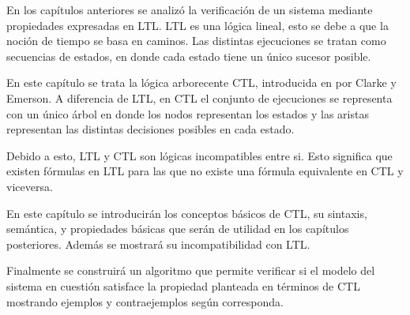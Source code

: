 En los capítulos anteriores se analizó la verificación de un sistema mediante propiedades expresadas
 en LTL.
LTL es una lógica lineal, esto se debe a que la noción de tiempo se basa en caminos.
Las distintas ejecuciones se tratan como secuencias de estados, en donde cada estado
 tiene un único sucesor posible.

En este capítulo se trata la lógica arborecente CTL, introducida en \cite{clarke}
 por Clarke y Emerson.
A diferencia de LTL, en CTL el conjunto de ejecuciones se representa
 con un único árbol en donde los nodos representan los estados y las aristas representan
 las distintas decisiones posibles en cada estado.

Debido a esto, LTL y CTL son lógicas incompatibles entre si.
Esto significa que existen fórmulas en LTL para las que no existe una fórmula equivalente
 en CTL y viceversa.
 
En este capítulo se introducirán los conceptos básicos de CTL, su sintaxis, semántica, y
 propiedades básicas que serán de utilidad en los capítulos posteriores.
Además se mostrará su incompatibilidad con LTL.

Finalmente se construirá un algoritmo que permite verificar si el modelo del sistema en cuestión
 satisface la propiedad planteada en términos de CTL mostrando ejemplos y contraejemplos según
 corresponda.